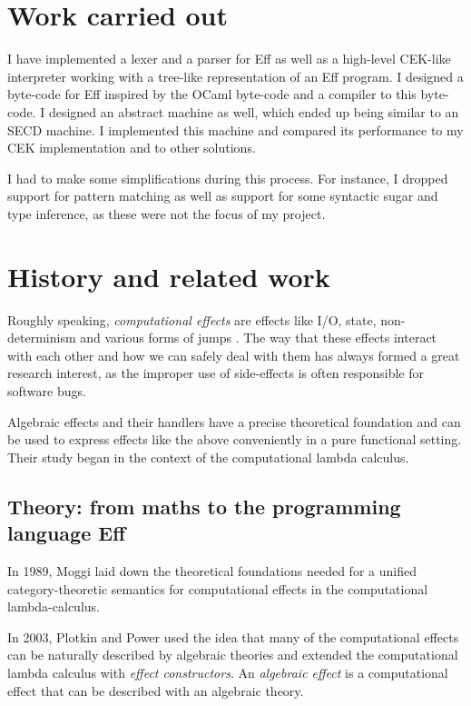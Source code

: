 \documentclass[class=article,crop=false,11pt]{standalone}
\begin{document}
\section{Work carried out}

I have implemented a lexer and a parser for Eff as well as a high-level
CEK-like interpreter working with a tree-like representation of an Eff program.
I designed a byte-code for Eff inspired by the OCaml byte-code and a compiler
to this byte-code. I designed an abstract machine as well, which ended up being
similar to an SECD machine. I implemented this machine and compared its
performance to my CEK implementation and to other solutions.

I had to make some simplifications during this process. For instance, I dropped
support for pattern matching as well as support for some syntactic sugar and
type inference, as these were not the focus of my project.

\section{History and related work}

Roughly speaking, \emph{computational effects} are effects like I/O, state,
non-determinism and  various forms of jumps \cite{plotkin2002computational}.
The way that these effects interact with each other and how we can safely deal
with them has always formed a great research interest, as the improper use of
side-effects is often responsible for software bugs.

Algebraic effects and their handlers have a precise theoretical foundation and
can be used to express effects like the above conveniently in a pure
functional setting. Their study began in the context of the computational
lambda calculus.

\subsection{Theory: from maths to the programming language Eff}

In 1989, Moggi \cite{moggi1989computational,moggi1990abstract} laid down the
theoretical foundations needed for a unified category-theoretic semantics for
computational effects in the computational lambda-calculus.

In 2003, Plotkin and Power \cite{plotkin2003algebraic} used the idea that many
of the computational effects can be naturally described by algebraic theories
and extended the computational lambda calculus with \emph{effect constructors}.
An \emph{algebraic effect} is a computational effect that can be described
with an algebraic theory.
\end{document}
